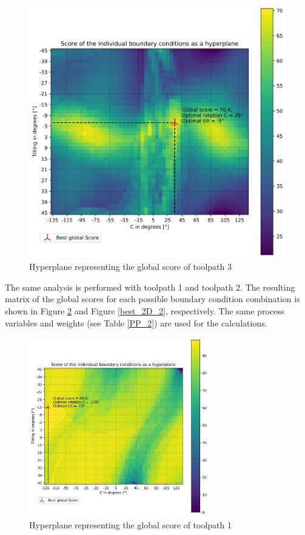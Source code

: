 \begin{figure}[H]
	\centerline{\includegraphics[width=1\textwidth]{figures/best_2D_3.png}}
	\caption{Hyperplane representing the global score of toolpath 3}
	\label{best_2D}
\end{figure}

The same analysis is performed with toolpath 1 and toolpath 2. The resulting matrix of the global scores for each possible boundary condition combination is shown in Figure \ref{best_2D_1} and Figure \ref{best_2D_2}, respectively. The same process variables and weights (see Table \ref{PP_2}) are used for the calculations.
\newpage

\begin{figure}[H]
	\centerline{\includegraphics[width=0.7\textwidth]{figures/best_2D_1.png}}
	\caption{Hyperplane representing the global score of toolpath 1}
	\label{best_2D_1}
\end{figure}

